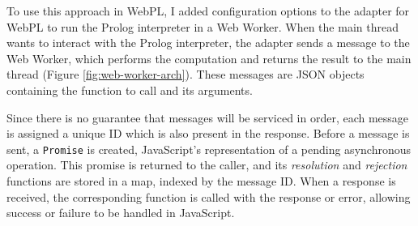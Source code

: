\vspace*{-1.5em}

To use this approach in WebPL, I added configuration options to the adapter for WebPL to run the Prolog interpreter in a Web Worker. When the main thread wants to interact with the Prolog interpreter, the adapter sends a message to the Web Worker, which performs the computation and returns the result to the main thread (Figure \ref{fig:web-worker-arch}). These messages are JSON objects containing the function to call and its arguments.

Since there is no guarantee that messages will be serviced in order, each message is assigned a unique ID which is also present in the response. Before a message is sent, a \texttt{Promise} is created, JavaScript's representation of a pending asynchronous operation. This promise is returned to the caller, and its \emph{resolution} and \emph{rejection} functions are stored in a map, indexed by the message ID. When a response is received, the corresponding function is called with the response or error, allowing success or failure to be handled in JavaScript.